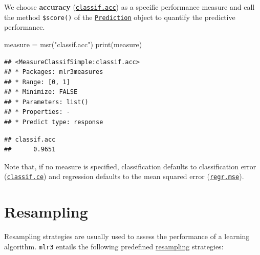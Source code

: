 \documentclass[
]{scrbook}
\newenvironment{Shaded}{\begin{snugshade}}{\end{snugshade}}
\newcommand{\FunctionTok}[1]{\textcolor[rgb]{0.00,0.00,0.00}{#1}}
\newcommand{\NormalTok}[1]{#1}
\newcommand{\OtherTok}[1]{\textcolor[rgb]{0.56,0.35,0.01}{#1}}
\newcommand{\SpecialCharTok}[1]{\textcolor[rgb]{0.00,0.00,0.00}{#1}}
\newcommand{\StringTok}[1]{\textcolor[rgb]{0.31,0.60,0.02}{#1}}
\renewenvironment{Shaded} {\begin{snugshade}\small} {\end{snugshade}}
\begin{document}
We choose \textbf{accuracy} (\href{https://mlr3.mlr-org.com/reference/mlr_measures_classif.acc.html}{\texttt{classif.acc}}) as a specific performance measure and call the method \texttt{\$score()} of the \href{https://mlr3.mlr-org.com/reference/Prediction.html}{\texttt{Prediction}} object to quantify the predictive performance.

\begin{Shaded}
\begin{Highlighting}[]
\NormalTok{measure }\OtherTok{=} \FunctionTok{msr}\NormalTok{(}\StringTok{"classif.acc"}\NormalTok{)}
\FunctionTok{print}\NormalTok{(measure)}
\end{Highlighting}
\end{Shaded}

\begin{verbatim}
## <MeasureClassifSimple:classif.acc>
## * Packages: mlr3measures
## * Range: [0, 1]
## * Minimize: FALSE
## * Parameters: list()
## * Properties: -
## * Predict type: response
\end{verbatim}

\begin{Shaded}
\end{Shaded}

\begin{verbatim}
## classif.acc 
##      0.9651
\end{verbatim}

Note that, if no measure is specified, classification defaults to classification error (\href{https://mlr3.mlr-org.com/reference/mlr_measures_classif.ce.html}{\texttt{classif.ce}}) and regression defaults to the mean squared error (\href{https://mlr3.mlr-org.com/reference/mlr_measures_regr.mse.html}{\texttt{regr.mse}}).

\hypertarget{resampling}{%
\section{Resampling}\label{resampling}}

Resampling strategies are usually used to assess the performance of a learning algorithm.
\texttt{mlr3} entails the following predefined \protect\hyperlink{resampling}{resampling} strategies:
\end{document}
